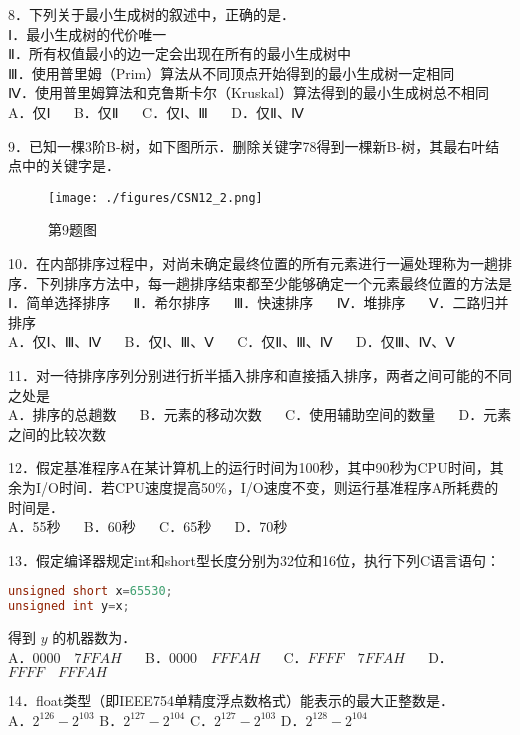 8．下列关于最小生成树的叙述中，正确的是．\\
Ⅰ．最小生成树的代价唯一\\
Ⅱ．所有权值最小的边一定会出现在所有的最小生成树中\\
Ⅲ．使用普里姆（Prim）算法从不同顶点开始得到的最小生成树一定相同\\
Ⅳ．使用普里姆算法和克鲁斯卡尔（Kruskal）算法得到的最小生成树总不相同\\
A．仅Ⅰ $\quad$ B．仅Ⅱ $\quad$ C．仅Ⅰ、Ⅲ $\quad$ D．仅Ⅱ、Ⅳ

9．已知一棵3阶B-树，如下图所示．删除关键字78得到一棵新B-树，其最右叶结点中的关键字是．\\
\begin{figure}[ht]
\centering
\texttt{[image: ./figures/CSN12\_2.png]}
\caption{第9题图} \label{CSN12_fig2}
\end{figure}

10．在内部排序过程中，对尚未确定最终位置的所有元素进行一遍处理称为一趟排序．下列排序方法中，每一趟排序结束都至少能够确定一个元素最终位置的方法是\\
Ⅰ．简单选择排序 $\quad$ Ⅱ．希尔排序 $\quad$ Ⅲ．快速排序 $\quad$ Ⅳ．堆排序 $\quad$ Ⅴ．二路归并排序\\
A．仅Ⅰ、Ⅲ、Ⅳ $\quad$ B．仅Ⅰ、Ⅲ、Ⅴ $\quad$ C．仅Ⅱ、Ⅲ、Ⅳ $\quad$ D．仅Ⅲ、Ⅳ、Ⅴ

11．对一待排序序列分别进行折半插入排序和直接插入排序，两者之间可能的不同之处是\\
A．排序的总趟数 $\quad$ B．元素的移动次数 $\quad$ C．使用辅助空间的数量 $\quad$ D．元素之间的比较次数

12．假定基准程序A在某计算机上的运行时间为100秒，其中90秒为CPU时间，其余为I/O时间．若CPU速度提高50\%，I/O速度不变，则运行基准程序A所耗费的时间是．\\
A．55秒 $\quad$ B．60秒 $\quad$ C．65秒 $\quad$ D．70秒

13．假定编译器规定int和short型长度分别为32位和16位，执行下列C语言语句：\\
\begin{lstlisting}[language=cpp]
unsigned short x=65530;
unsigned int y=x;
\end{lstlisting}
得到 $y$ 的机器数为．\\
A．$0000 \quad 7FFAH$ $\quad$ B．$0000 \quad FFFAH$ $\quad$ C．$FFFF \quad 7FFAH$ $\quad$ D．$FFFF \quad FFFAH$

14．float类型（即IEEE754单精度浮点数格式）能表示的最大正整数是．\\
A．$2^{126}-2^{103}$ B．$2^{127}-2^{104}$ C．$2^{127}-2^{103}$ D．$2^{128}-2^{104}$

